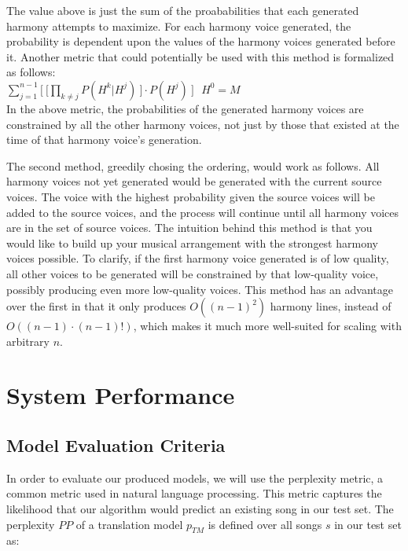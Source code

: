 \documentclass{sig-alternate}
\begin{document}
The value above is just the sum of the proababilities that each generated harmony attempts to maximize. For each harmony voice generated, the probability is dependent upon the values of the harmony voices generated before it. Another metric that could potentially be used with this method is formalized as follows: \\

$\sum_{j = 1}^{n - 1} \lbrack\ \lbrack\prod_{k \neq j} P(H^{k} | H^{j})\ \rbrack \cdot P(H^{j})\ \rbrack\ \ \ H^{0} = M$\\

In the above metric, the probabilities of the generated harmony voices are constrained by all the other harmony voices, not just by those that existed at the time of that harmony voice's generation. 

The second method, greedily chosing the ordering, would work as follows. All harmony voices not yet generated would be generated with the current source voices. The voice with the highest probability given the source voices will be added to the source voices, and the process will continue until all harmony voices are in the set of source voices. The intuition behind this method is that you would like to build up your musical arrangement with the strongest harmony voices possible. To clarify, if the first harmony voice generated is of low quality, all other voices to be generated will be constrained by that low-quality voice, possibly producing even more low-quality voices. This method has an advantage over the first in that it only produces $O((n-1)^{2})$ harmony lines, instead of $O((n -1)\cdot(n-1)!)$, which makes it much more well-suited for scaling with arbitrary $n$.

\section{System Performance}
\label{sec:sys_perform}
\subsection{Model Evaluation Criteria}
In order to evaluate our produced models, we will use the perplexity metric, a common metric used in natural language 
processing. This metric captures the likelihood that our algorithm would predict an existing song in our test set. The perplexity $PP$ \cite{Koehn:2010:SMT:1734086} of a translation model $p_{TM}$ is defined over all songs $s$ in our test set as:\\
\end{document}
